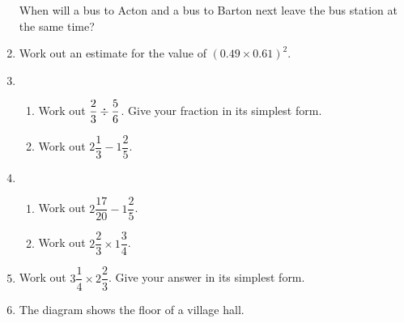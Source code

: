 \begin{enumerate}
      When will a bus to Acton and a bus to Barton next leave the bus station at the same time?\\[3cm]\vspace*{0pt}\hfill\dline
      \item Work out an estimate for the value of $(0.49 \times 0.61)^2$.\\[2cm]\vspace*{0pt}\hfill\dline
      \newpage
      \item %
      \begin{enumerate}
        \item Work out $\dfrac{2}{3} \divisionsymbol \dfrac{5}{6}$. Give your fraction in its simplest form.\\[2.5cm]\vspace*{0pt}\hfill\dline
        \item Work out $2\dfrac{1}{3} - 1\dfrac{2}{5}$.\\[2.5cm]\vspace*{0pt}\hfill\dline
      \end{enumerate}
      \item %
      \begin{enumerate}
        \item Work out $2\dfrac{17}{20} - 1\dfrac{2}{5}$.\\[2.5cm]\vspace*{0pt}\hfill\dline
        \item Work out $2\dfrac{2}{3} \times 1\dfrac{3}{4}$.\\[2.5cm]\vspace*{0pt}\hfill\dline
      \end{enumerate}
      \item Work out $3\dfrac{1}{4} \times 2\dfrac{2}{3}$. Give your answer in its simplest form.\\[2.5cm]\vspace*{0pt}\hfill\dline
      \item The diagram shows the floor of a village hall.
      \begin{figure}[H]
        \centering
\end{figure}
\end{enumerate}
